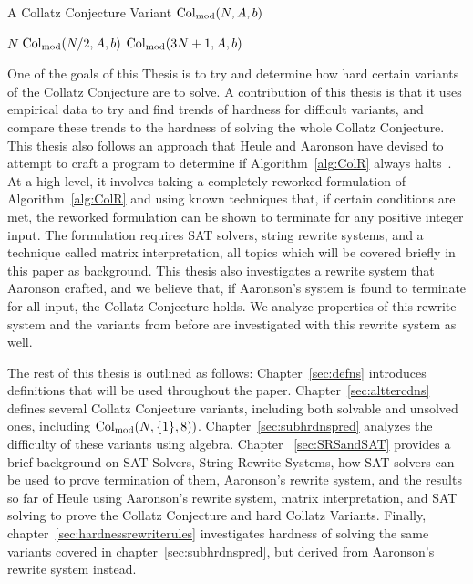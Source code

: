 \begin{algorithm} 
\caption{A Collatz Conjecture Variant $\mathrm{Col}_{\text{mod}}(N,A,b)$}
\label{alg:ColSP} 
\begin{algorithmic}[1]
     \Return $N$
    \EndIf
     \Return $\mathrm{Col}_{\text{mod}}(N/2,A,b)$
    \EndIf
    \State \Return $\mathrm{Col}_{\text{mod}}(3N+1,A,b)$ 
\end{algorithmic}
\end{algorithm}
One of the goals of this Thesis is to try and determine how hard certain variants of the Collatz Conjecture are to solve. A contribution of this thesis is that it uses empirical data to try and find trends of hardness for difficult variants, and compare these trends to the hardness of solving the whole Collatz Conjecture. This thesis also follows an approach that Heule and Aaronson have devised to attempt to craft a program to determine if Algorithm~\ref{alg:ColR} always halts~\cite{HeuleAaronson}. At a high level, it involves taking a completely reworked formulation of Algorithm~\ref{alg:ColR} and using known techniques that, if certain conditions are met, the reworked formulation can be shown to terminate for any positive integer input. The formulation requires SAT solvers, string rewrite systems, and a technique called matrix interpretation, all topics which will be covered briefly in this paper as background. This thesis also investigates a rewrite system that Aaronson crafted, and we believe that, if Aaronson's system is found to terminate for all input, the Collatz Conjecture holds. We analyze properties of this rewrite system and the variants from before are investigated with this rewrite system as well.\par
The rest of this thesis is outlined as follows: Chapter~\ref{sec:defns} introduces definitions that will be used throughout the paper. Chapter~\ref{sec:alttercdns} defines several Collatz Conjecture variants, including both solvable and unsolved ones, including $\mathrm{Col}_{\text{mod}}(N,\{1\},8))$. Chapter~\ref{sec:subhrdnspred} analyzes the difficulty of these variants using algebra. Chapter ~\ref{sec:SRSandSAT} provides a brief background on SAT Solvers, String Rewrite Systems, how SAT solvers can be used to prove termination of them, Aaronson's rewrite system, and the results so far of Heule using Aaronson's rewrite system, matrix interpretation, and SAT solving to prove the Collatz Conjecture and hard Collatz Variants. Finally, chapter~\ref{sec:hardnessrewriterules} investigates hardness of solving the same variants covered in chapter~\ref{sec:subhrdnspred}, but derived from Aaronson's rewrite system instead.